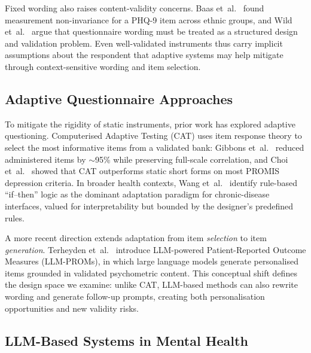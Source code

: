\documentclass[conference]{IEEEtran}
\begin{document}
Fixed wording also raises content-validity concerns. Baas et~al.\
\cite{baas2011} found measurement non-invariance for a PHQ-9 item across
ethnic groups, and Wild et~al.\ \cite{wild2005} argue that questionnaire
wording must be treated as a structured design and validation problem.
Even well-validated instruments thus carry implicit assumptions about the
respondent that adaptive systems may help mitigate through
context-sensitive wording and item selection.

\subsection{Adaptive Questionnaire Approaches}
\label{subsec:rw_adaptive}

To mitigate the rigidity of static instruments, prior work has explored
adaptive questioning. Computerised Adaptive Testing (CAT) uses item
response theory to select the most informative items from a validated
bank: Gibbons et~al.\ \cite{gibbons2008} reduced administered items by
$\sim$95\% while preserving full-scale correlation, and Choi et~al.\
\cite{choi2010} showed that CAT outperforms static short forms on most
PROMIS depression criteria. In broader health contexts, Wang et~al.\
\cite{wang2023} identify rule-based ``if--then'' logic as the dominant
adaptation paradigm for chronic-disease interfaces, valued for
interpretability but bounded by the designer's predefined rules.

A more recent direction extends adaptation from item \emph{selection} to
item \emph{generation}. Terheyden et~al.\ \cite{terheyden2025} introduce
LLM-powered Patient-Reported Outcome Measures (LLM-PROMs), in which large
language models generate personalised items grounded in validated
psychometric content. This conceptual shift defines the design space we
examine: unlike CAT, LLM-based methods can also rewrite wording and
generate follow-up prompts, creating both personalisation opportunities
and new validity risks.

\subsection{LLM-Based Systems in Mental Health}
\label{subsec:rw_llm_mh}
\end{document}
